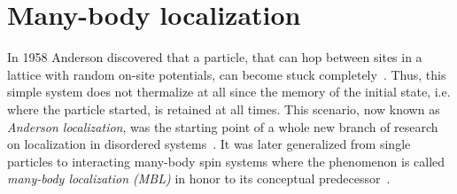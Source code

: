 %
%

\section{Many-body localization}
\label{sec:MBL}
In 1958 Anderson discovered that a particle, that can hop between sites in a lattice with random on-site potentials, can become stuck completely~\cite{andersonAbsenceDiffusionCertain1958}. Thus, this simple system does not thermalize at all since the memory of the initial state, i.e. where the particle started, is retained at all times. This scenario, now known as \emph{Anderson localization}, was the starting point of a whole new branch of research on localization in disordered systems~\cite{imbrieReviewLocalIntegrals2017,abaninRecentProgressManybody2017,parameswaranEigenstatePhaseTransitions2017,abaninManybodyLocalizationThermalization2019,laflorencieEntanglementEntropyLocalization2022,sierantManyBodyLocalizationAge2024}.
It was later generalized from single particles to interacting many-body spin systems where the phenomenon is called \emph{many-body localization (MBL)} in honor to its conceptual predecessor~\cite{fleishmanInteractionsAndersonTransition1980,baskoMetalinsulatorTransitionWeakly2006,gornyiInteractingElectronsDisordered2005}.


